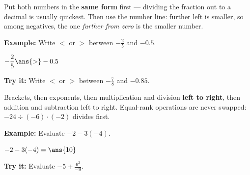 \documentclass[12pt]{article}
\begin{document}

\begin{formulabox}
Put both numbers in the \textbf{same form} first --- dividing the fraction out
to a decimal is usually quickest. Then use the number line: further left is
smaller, so among negatives, the one \emph{further from zero} is the smaller
number.
\end{formulabox}

\begin{examplebox}
\textbf{Example:} \quad Write $<$ or $>$ between $-\frac{2}{5}$ and $-0.5$.

$-\dfrac{2}{5} \ans{>} -0.5$
\end{examplebox}

\begin{tryitbox}
\textbf{Try it:} \quad Write $<$ or $>$ between $-\frac{7}{8}$ and
$-0.85$.\\[2pt]
\end{tryitbox}


\begin{formulabox}
Brackets, then exponents, then multiplication and division \textbf{left to
right}, then addition and subtraction left to right. Equal-rank operations are
never swapped: $-24 \div (-6) \cdot (-2)$ divides first.
\end{formulabox}

\begin{examplebox}
\textbf{Example:} \quad Evaluate $-2 - 3(-4)$.

$-2 - 3(-4) = \ans{10}$
\end{examplebox}

\begin{tryitbox}
\textbf{Try it:} \quad Evaluate $-5 + \frac{6^2}{-9}$.\\[2pt]
\end{tryitbox}
\end{document}
